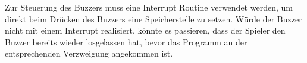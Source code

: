Zur Steuerung des Buzzers muss eine Interrupt Routine verwendet werden, um direkt beim Drücken des Buzzers eine Speicherstelle zu setzen. Würde der Buzzer nicht mit einem Interrupt realisiert, könnte es passieren, dass der Spieler den Buzzer bereits wieder losgelassen hat, bevor das Programm an der entsprechenden Verzweigung angekommen ist.

